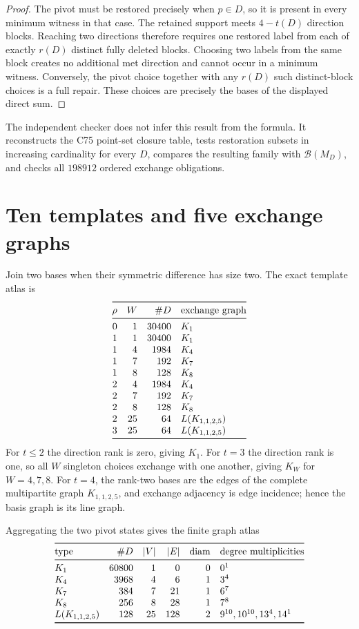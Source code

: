 \documentclass[10pt]{article}
\begin{document}
\begin{proof}
The pivot must be restored precisely when $p\in D$, so it is present in every
minimum witness in that case.  The retained support meets $4-t(D)$ direction
blocks.  Reaching two directions therefore requires one restored label from
each of exactly $r(D)$ distinct fully deleted blocks.  Choosing two labels
from the same block creates no additional met direction and cannot occur in a
minimum witness.  Conversely, the pivot choice together with any $r(D)$ such
distinct-block choices is a full repair.  These choices are precisely the
bases of the displayed direct sum.
\end{proof}

The independent checker does not infer this result from the formula.  It
reconstructs the C75 point-set closure table, tests restoration subsets in
increasing cardinality for every $D$, compares the resulting family with
$\mathcal B(M_D)$, and checks all $198912$ ordered exchange obligations.

\section{Ten templates and five exchange graphs}
Join two bases when their symmetric difference has size two.  The exact
template atlas is
\[
\begin{array}{@{}rrrl@{}}
\toprule
\rho&W&\#D&\text{exchange graph}\\\midrule
0&1&30400&K_1\\
1&1&30400&K_1\\
1&4&1984&K_4\\
1&7&192&K_7\\
1&8&128&K_8\\
2&4&1984&K_4\\
2&7&192&K_7\\
2&8&128&K_8\\
2&25&64&L(K_{1,1,2,5})\\
3&25&64&L(K_{1,1,2,5})\\
\bottomrule
\end{array}
\]
For $t\leq2$ the direction rank is zero, giving $K_1$.  For $t=3$ the
direction rank is one, so all $W$ singleton choices exchange with one another,
giving $K_W$ for $W=4,7,8$.  For $t=4$, the rank-two bases are the edges of
the complete multipartite graph $K_{1,1,2,5}$, and exchange adjacency is edge
incidence; hence the basis graph is its line graph.

Aggregating the two pivot states gives the finite graph atlas
\[
\begin{array}{@{}lrrrrl@{}}
\toprule
\text{type}&\#D&|V|&|E|&\operatorname{diam}&\text{degree multiplicities}\\\midrule
K_1&60800&1&0&0&0^1\\
K_4&3968&4&6&1&3^4\\
K_7&384&7&21&1&6^7\\
K_8&256&8&28&1&7^8\\
L(K_{1,1,2,5})&128&25&128&2&9^{10},10^{10},13^4,14^1\\
\bottomrule
\end{array}
\]
\end{document}
